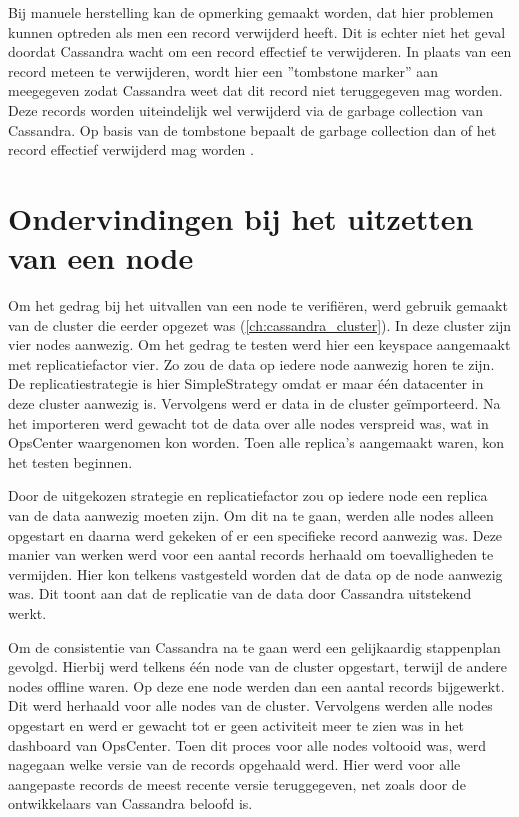 Bij manuele herstelling kan de opmerking gemaakt worden, dat hier problemen kunnen optreden als men een record verwijderd heeft.
Dit is echter niet het geval doordat Cassandra wacht om een record effectief te verwijderen.
In plaats van een record meteen te verwijderen, wordt hier een ''tombstone marker'' aan meegegeven zodat Cassandra weet dat dit record niet teruggegeven mag worden.
Deze records worden uiteindelijk wel verwijderd via de garbage collection van Cassandra.
Op basis van de tombstone bepaalt de garbage collection dan of het record effectief verwijderd mag worden \citep{strickland2014availability}.

\section{Ondervindingen bij het uitzetten van een node}
Om het gedrag bij het uitvallen van een node te verifiëren, werd gebruik gemaakt van de cluster die eerder opgezet was (\ref{ch:cassandra_cluster}).
In deze cluster zijn vier nodes aanwezig.
Om het gedrag te testen werd hier een keyspace aangemaakt met replicatiefactor vier.
Zo zou de data op iedere node aanwezig horen te zijn.
De replicatiestrategie is hier SimpleStrategy omdat er maar één datacenter in deze cluster aanwezig is. Vervolgens werd er data in de cluster geïmporteerd.
Na het importeren werd gewacht tot de data over alle nodes verspreid was, wat in OpsCenter waargenomen kon worden.
Toen alle replica's aangemaakt waren, kon het testen beginnen.

Door de uitgekozen strategie en replicatiefactor zou op iedere node een replica van de data aanwezig moeten zijn.
Om dit na te gaan, werden alle nodes alleen opgestart en daarna werd gekeken of er een specifieke record aanwezig was.
Deze manier van werken werd voor een aantal records herhaald om toevalligheden te vermijden.
Hier kon telkens vastgesteld worden dat de data op de node aanwezig was.
Dit toont aan dat de replicatie van de data door Cassandra uitstekend werkt.

Om de consistentie van Cassandra na te gaan werd een gelijkaardig stappenplan gevolgd.
Hierbij werd telkens één node van de cluster opgestart, terwijl de andere nodes offline waren.
Op deze ene node werden dan een aantal records bijgewerkt.
Dit werd herhaald voor alle nodes van de cluster.
Vervolgens werden alle nodes opgestart en werd er gewacht tot er geen activiteit meer te zien was in het dashboard van OpsCenter.
Toen dit proces voor alle nodes voltooid was, werd nagegaan welke versie van de records opgehaald werd.
Hier werd voor alle aangepaste records de meest recente versie teruggegeven, net zoals door de ontwikkelaars van Cassandra beloofd is.